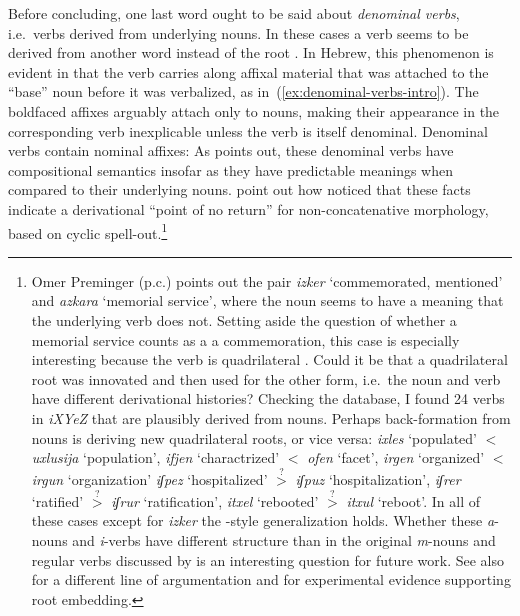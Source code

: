 Before concluding, one last word ought to be said about \emph{denominal verbs}, i.e.~verbs derived from underlying nouns. In these cases a verb seems to be derived from another word instead of the root \citep{batel94,ussishkin99,ussishkin05,arad03}. In Hebrew, this phenomenon is evident in that the verb carries along affixal material that was attached to the ``base'' noun before it was verbalized, as in~(\ref{ex:denominal-verbs-intro}). The boldfaced affixes arguably attach only to nouns, making their appearance in the corresponding verb inexplicable unless the verb is itself denominal.
\pex \label{ex:denominal-verbs-intro}Denominal verbs contain nominal affixes:
\xe
As \cite{arad03} points out, these denominal verbs have compositional semantics insofar as they have predictable meanings when compared to their underlying nouns. \cite{kastnertucker19cup} point out how \citeauthor{arad03} noticed that these facts indicate a derivational ``point of no return'' for non-concatenative morphology, based on cyclic spell-out.\footnote{Omer Preminger (p.c.) points out the pair \emph{izker} `commemorated, mentioned' and \emph{azkara} `memorial service', where the noun seems to have a meaning that the underlying verb does not. Setting aside the question of whether a memorial service counts as a a commemoration, this case is especially interesting because the verb is quadrilateral \citep{schwarzwald16}. Could it be that a quadrilateral root  was innovated and then used for the other form, i.e.~the noun and verb have different derivational histories? Checking the database, I found 24 verbs in \emph{iXYeZ} that are plausibly derived from nouns. Perhaps back-formation from nouns is deriving new quadrilateral roots, or vice versa:
\pex
	\a \emph{ixles} `populated' $<$ \emph{uxlusija} `population', \emph{ifjen} `charactrized' $<$ \emph{ofen} `facet', \emph{irgen} `organized' $<$ \emph{irgun} `organization'
	\a \emph{iʃpez} `hospitalized' $\overset{?}{>}$ \emph{iʃpuz} `hospitalization', \emph{iʃrer} `ratified' $\overset{?}{>}$ \emph{iʃrur} `ratification', \emph{itxel} `rebooted' $\overset{?}{>}$ \emph{itxul} `reboot'.
\xe
In all of these cases except for \emph{izker} the \citeauthor{arad03}-style generalization holds. Whether these \emph{a}-nouns and \emph{i}-verbs have different structure than in the original \emph{m}-nouns and regular verbs discussed by \cite{arad03} is an interesting question for future work. See also \cite{ouhalla16} for a different line of argumentation and \cite{brice16} for experimental evidence supporting root embedding.}

